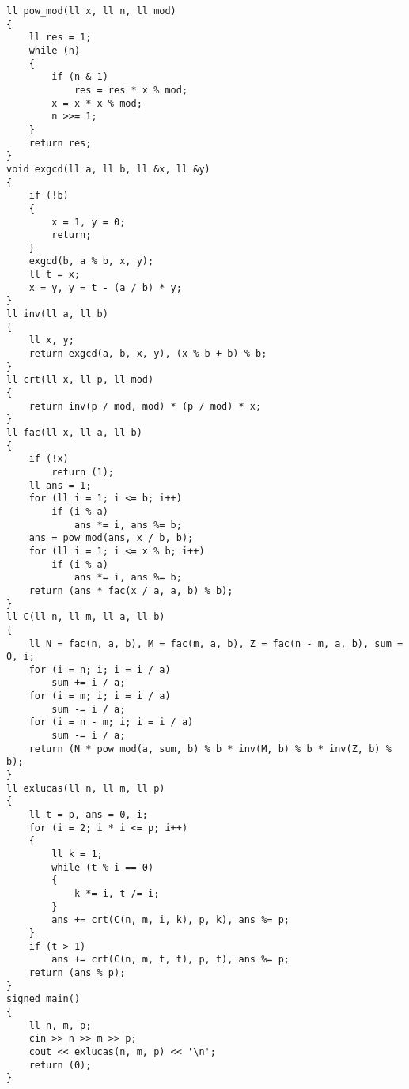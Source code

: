 \documentclass[E:/GsjzTle/main/main.tex]{subfiles}
\begin{document}
\begin{lstlisting}
ll pow_mod(ll x, ll n, ll mod)
{
    ll res = 1;
    while (n)
    {
        if (n & 1)
            res = res * x % mod;
        x = x * x % mod;
        n >>= 1;
    }
    return res;
}
void exgcd(ll a, ll b, ll &x, ll &y)
{
    if (!b)
    {
        x = 1, y = 0;
        return;
    }
    exgcd(b, a % b, x, y);
    ll t = x;
    x = y, y = t - (a / b) * y;
}
ll inv(ll a, ll b)
{
    ll x, y;
    return exgcd(a, b, x, y), (x % b + b) % b;
}
ll crt(ll x, ll p, ll mod)
{
    return inv(p / mod, mod) * (p / mod) * x;
}
ll fac(ll x, ll a, ll b)
{
    if (!x)
        return (1);
    ll ans = 1;
    for (ll i = 1; i <= b; i++)
        if (i % a)
            ans *= i, ans %= b;
    ans = pow_mod(ans, x / b, b);
    for (ll i = 1; i <= x % b; i++)
        if (i % a)
            ans *= i, ans %= b;
    return (ans * fac(x / a, a, b) % b);
}
ll C(ll n, ll m, ll a, ll b)
{
    ll N = fac(n, a, b), M = fac(m, a, b), Z = fac(n - m, a, b), sum = 0, i;
    for (i = n; i; i = i / a)
        sum += i / a;
    for (i = m; i; i = i / a)
        sum -= i / a;
    for (i = n - m; i; i = i / a)
        sum -= i / a;
    return (N * pow_mod(a, sum, b) % b * inv(M, b) % b * inv(Z, b) % b);
}
ll exlucas(ll n, ll m, ll p)
{
    ll t = p, ans = 0, i;
    for (i = 2; i * i <= p; i++)
    {
        ll k = 1;
        while (t % i == 0)
        {
            k *= i, t /= i;
        }
        ans += crt(C(n, m, i, k), p, k), ans %= p;
    }
    if (t > 1)
        ans += crt(C(n, m, t, t), p, t), ans %= p;
    return (ans % p);
}
signed main()
{
    ll n, m, p;
    cin >> n >> m >> p;
    cout << exlucas(n, m, p) << '\n';
    return (0);
}
\end{lstlisting}
\end{document}
